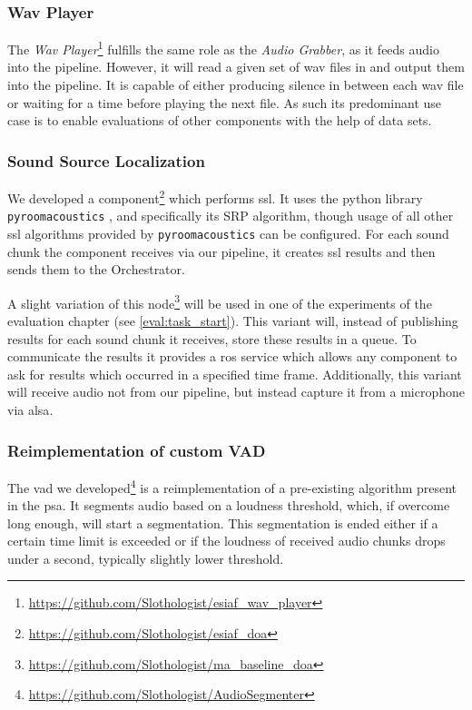 \subsubsection{Wav Player}
\label{main:components:wav}
The \textit{Wav Player}\footnote{\url{https://github.com/Slothologist/esiaf_wav_player}} fulfills the same role as the \textit{Audio Grabber}, as it feeds audio into the pipeline.
However, it will read a given set of wav files in and output them into the pipeline.
It is capable of either producing silence in between each wav file or waiting for a time before playing the next file.
As such its predominant use case is to enable evaluations of other components with the help of data sets.

\subsubsection{Sound Source Localization}
\label{main:components:ssl}
We developed a component\footnote{\url{https://github.com/Slothologist/esiaf_doa}} which performs \gls{ssl}.
It uses the python library \texttt{pyroomacoustics} \cite{pyroomacoustics}, and specifically its SRP algorithm, though usage of all other \gls{ssl} algorithms provided by \texttt{pyroomacoustics} can be configured.
For each sound chunk the component receives via our pipeline, it creates \gls{ssl} results and then sends them to the Orchestrator.

A slight variation of this node\footnote{\url{https://github.com/Slothologist/ma_baseline_doa}}  will be used in one of the experiments of the evaluation chapter (see \ref{eval:task_start}).
This variant will, instead of publishing results for each sound chunk it receives, store these results in a queue.
To communicate the results it provides a \gls{ros} service which allows any component to ask for results which occurred in a specified time frame.
Additionally, this variant will receive audio not from our pipeline, but instead capture it from a microphone via \gls{alsa}.

\subsubsection{Reimplementation of custom VAD}
\label{main:components:vad}
The \gls{vad} we developed\footnote{\url{https://github.com/Slothologist/AudioSegmenter}} is a reimplementation of a pre-existing algorithm present in the \gls{psa}.
It segments audio based on a loudness threshold, which, if overcome long enough, will start a segmentation.
This segmentation is ended either if a certain time limit is exceeded or if the loudness of received audio chunks drops under a second, typically slightly lower threshold.

